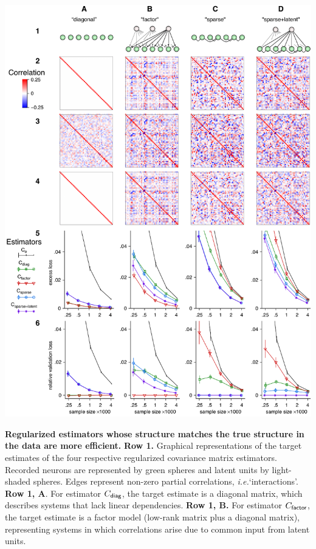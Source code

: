\documentclass[10pt]{article}
\newcommand{\sq}[1]{\lq#1\rq}
\newcommand{\ie}{\emph{i.e.}\;}
\begin{document}
\begin{FPfigure}
    \begin{center}
        \includegraphics{./figures/Figure01.pdf}
    \end{center}
    \caption{{\bf Regularized estimators whose structure matches the true structure in the data are more efficient.}
    {\bf Row 1.} Graphical representations of the target estimates of the four respective regularized covariance matrix estimators.  Recorded neurons are represented by green spheres and latent units by light-shaded spheres.  Edges represent non-zero partial correlations, \ie \sq{interactions}.
        {\bf Row 1, A}.  For estimator $C_{\sf diag}$, the target estimate is a diagonal matrix, which describes systems that lack linear dependencies. 
        {\bf  Row 1, B.} For estimator $C_{\sf factor}$, the target estimate is a factor model (low-rank matrix plus a diagonal matrix), representing systems in which correlations arise due to common input from latent units. 
}
\end{FPfigure}
\end{document}
